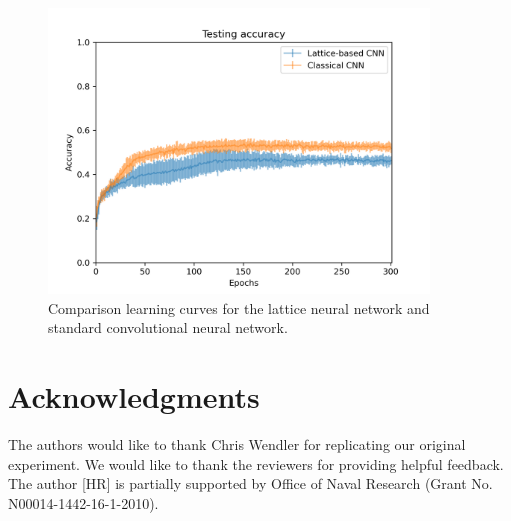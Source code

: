 \documentclass{article}
\begin{document}
\begin{figure}[h!]
  \caption{Comparison learning curves for the lattice neural network and
    standard convolutional neural network.}\label{fig:comparison}
    \begin{center}
    \includegraphics[width=0.9\textwidth]{testing.png}
    \end{center}
\end{figure}

\section*{Acknowledgments}
The authors would like to thank Chris Wendler for replicating our original experiment. We would like to thank the reviewers for providing helpful feedback. The author [HR] is partially supported by Office of Naval Research (Grant No. N00014-1442-16-1-2010).
\small


\end{document}
